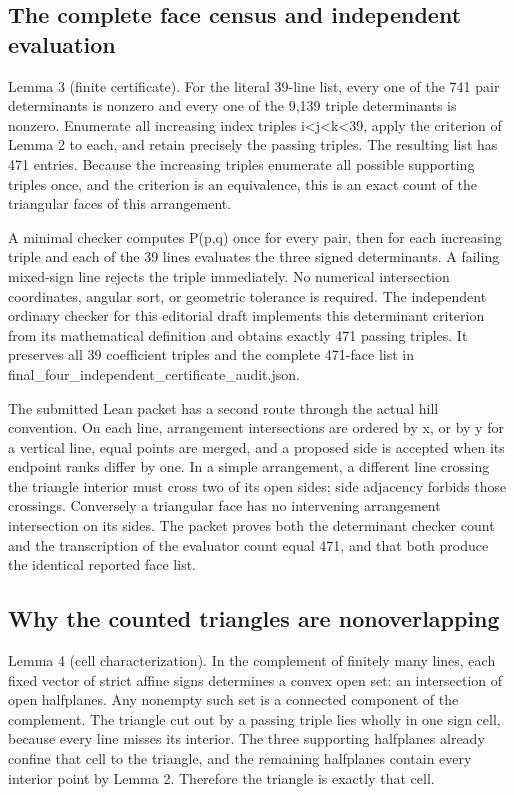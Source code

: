 \documentclass[11pt,a4paper]{article}
\begin{document}
\subsection{The complete face census and independent evaluation}
Lemma 3 (finite certificate). For the literal 39-line list, every one of the 741 pair determinants is nonzero and every one of the 9,139 triple determinants is nonzero. Enumerate all increasing index triples i<j<k<39, apply the criterion of Lemma 2 to each, and retain precisely the passing triples. The resulting list has 471 entries. Because the increasing triples enumerate all possible supporting triples once, and the criterion is an equivalence, this is an exact count of the triangular faces of this arrangement.

A minimal checker computes P(p,q) once for every pair, then for each increasing triple and each of the 39 lines evaluates the three signed determinants. A failing mixed-sign line rejects the triple immediately. No numerical intersection coordinates, angular sort, or geometric tolerance is required. The independent ordinary checker for this editorial draft implements this determinant criterion from its mathematical definition and obtains exactly 471 passing triples. It preserves all 39 coefficient triples and the complete 471-face list in final\_four\_independent\_certificate\_audit.json.

The submitted Lean packet has a second route through the actual hill convention. On each line, arrangement intersections are ordered by x, or by y for a vertical line, equal points are merged, and a proposed side is accepted when its endpoint ranks differ by one. In a simple arrangement, a different line crossing the triangle interior must cross two of its open sides; side adjacency forbids those crossings. Conversely a triangular face has no intervening arrangement intersection on its sides. The packet proves both the determinant checker count and the transcription of the evaluator count equal 471, and that both produce the identical reported face list.

\subsection{Why the counted triangles are nonoverlapping}
Lemma 4 (cell characterization). In the complement of finitely many lines, each fixed vector of strict affine signs determines a convex open set: an intersection of open halfplanes. Any nonempty such set is a connected component of the complement. The triangle cut out by a passing triple lies wholly in one sign cell, because every line misses its interior. The three supporting halfplanes already confine that cell to the triangle, and the remaining halfplanes contain every interior point by Lemma 2. Therefore the triangle is exactly that cell.
\end{document}
